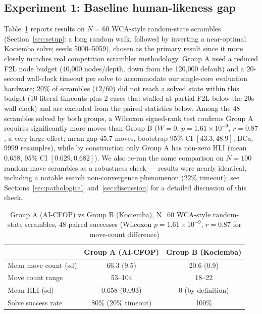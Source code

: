 \documentclass[10pt,conference]{article}
\begin{document}
\subsection{Experiment 1: Baseline human-likeness gap}
Table~\ref{tab:exp1} reports results on $N=60$ WCA-style
random-state scrambles (Section~\ref{sec:setup}: a long random walk,
followed by inverting a near-optimal Kociemba solve; seeds
5000--5059), chosen as the primary result since it more closely
matches real competition scrambler methodology. Group A used a
reduced F2L node budget (40{,}000 nodes/depth, down from the
120{,}000 default) and a 20-second wall-clock timeout per solve to
accommodate our single-core evaluation hardware; $20\%$ of scrambles
($12/60$) did not reach a solved state within this budget (10
literal timeouts plus 2 cases that stalled at partial F2L below the
20s wall clock) and are excluded from the paired
statistics below. Among the $48$ scrambles solved by both groups, a
Wilcoxon signed-rank test confirms Group A requires significantly
more moves than Group B ($W=0$, $p=1.61\times10^{-9}$, $r=0.87$, a
very large effect; mean gap $45.7$ moves, bootstrap 95\% CI
$[43.3, 48.9]$, BCa, $9999$ resamples), while by construction only
Group A has non-zero HLI (mean $0.658$, 95\% CI $[0.629, 0.682]$).
We also re-ran the same comparison on $N=100$ random-move
scrambles as a robustness check --- results were nearly identical,
including a notable search non-convergence phenomenon ($22\%$
timeout); see Sections~\ref{sec:pathological} and~\ref{sec:discussion}
for a detailed discussion of this check.

\begin{table}[h]
\centering
\caption{Group A (AI-CFOP) vs Group B (Kociemba), N=60 WCA-style
random-state scrambles, 48 paired successes (Wilcoxon
$p=1.61\times10^{-9}$, $r=0.87$ for move-count difference)}
\begin{tabular}{lcc}
\toprule
 & Group A (AI-CFOP) & Group B (Kociemba) \\
\midrule
Mean move count (sd) & 66.3 (9.5) & 20.6 (0.9) \\
Move count range & 53--104 & 18--22 \\
Mean HLI (sd) & 0.658 (0.093) & 0 (by definition) \\
Solve success rate & 80\% (20\% timeout) & 100\% \\
\bottomrule
\end{tabular}
\label{tab:exp1}
\end{table}
\end{document}
